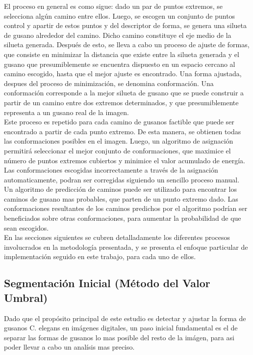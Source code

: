 El proceso en general es como sigue: dado un par de puntos extremos, se selecciona
alg\'un camino entre ellos. Luego, se escogen un conjunto de puntos control y
apartir de estos puntos y del descriptor de forma, 
se genera una silueta de gusano alrededor del camino. Dicho camino constituye el 
eje medio de la silueta generada. Despu\'es de esto, se lleva a cabo un proceso de 
ajuste de formas, que consiste en minimizar la distancia que existe entre la silueta
generada y el gusano que presumiblemente se encuentra dispuesto en un espacio 
cercano al camino escogido, hasta que el mejor ajuste es encontrado. Una forma ajustada,
despues del proceso de minimizaci\'on, se denomina conformaci\'on. Una conformaci\'on 
corresponde a la mejor silueta de gusano que se puede construir a partir de un camino
entre dos extremos determinados, y que presumiblemente representa a un gusano real
de la imagen. \\

Este proceso es repetido para cada camino de gusanos factible que puede ser encontrado
a partir de cada punto extremo. De esta manera, se obtienen todas las conformaciones
posibles en el imagen. Luego, un algoritmo de asignaci\'on permitir\'a seleccionar
el mejor conjunto de conformaciones, que maximice el n\'umero de puntos extremos cubiertos
y minimice el valor acumulado de energ\'ia. Las conformaciones escogidas incorrectamente
a trav\'es de la asignaci\'on automaticamente, podran ser corregidas siguiendo
un sencillo proceso manual.\\

Un algoritmo de predicci\'on de caminos puede ser utilizado para encontrar
los caminos de gusano mas probables, que parten de un punto extremo dado.
Las conformaciones resultantes de los caminos predichos por el algoritmo podr\'ian
ser beneficiados sobre otras conformaciones, para aumentar la probabilidad de que
sean escogidos.\\

En las secciones siguientes se cubren detalladamente los diferentes procesos
involucrados en la metodolog\'ia presentada, y se presenta el enfoque particular
de implementaci\'on seguido en este trabajo, para cada uno de ellos.
  

\subsection{Segmentaci\'on Inicial (M\'etodo del Valor Umbral)}
\label{sec:metthres}

Dado que el prop\'osito principal de este estudio es detectar y ajustar la forma de 
gusanos C. elegans en im\'agenes digitales, un paso inicial fundamental es el de separar
las formas de gusanos lo mas posible del resto de la im\'agen, para asi poder llevar a
cabo un anal\'isis mas preciso.\\

